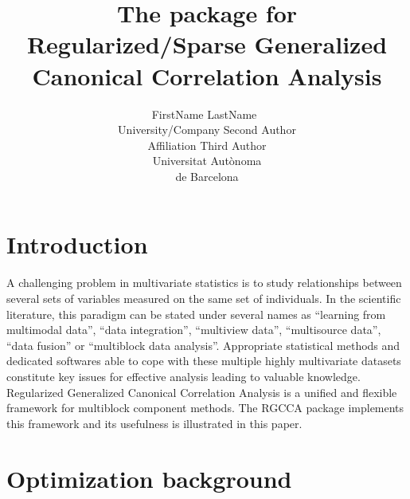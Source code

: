 \documentclass[
]{jss}
\author{
FirstName
LastName~\orcidlink{0000-0000-0000-0000}\\University/Company \And Second
Author\\Affiliation \AND Third Author\\Universitat Autònoma\\
de Barcelona
}
\title{The \pkg{RGCCA} package for Regularized/Sparse Generalized
Canonical Correlation Analysis}
\begin{document}
\newcommand{\ma}[1]{\ensuremath{\mathbf{#1}}}
\newcommand{\sign}{\ensuremath{\mathrm{sign}}}
\newcommand{\mat}[1]{\textbf{\text{#1}}}
\newcommand{\cov}{\ensuremath{\text{cov}}}
\newcommand{\var}{\ensuremath{\mathrm{var}}}
\newcommand{\tr}{\ensuremath{\mathrm{tr}}}
\newcommand{\argmin}{\ensuremath{\mathrm{argmin}}}
\newcommand{\argmax}{\ensuremath{\mathrm{argmax}}}
\newcommand{\X}{\mathbf{X}}
\newcommand{\A}{\mathbf{A}}
\newcommand{\Q}{\mathbf{Q}}
\newcommand{\M}{\mathbf{M}}
\newcommand{\C}{\mathbf{C}}
\newcommand{\mbc}{\mathbf{c}}
\newcommand{\I}{\mathbf{I}}
\newcommand{\mbP}{\mathbf{P}}
\newcommand{\mba}{\mathbf{a}}
\newcommand{\z}{\mathbf{z}}
\newcommand{\w}{\mathbf{w}}
\newcommand{\y}{\mathbf{y}}
\newcommand{\mbb}{\mathbf{b}}
\newcommand{\Xu}{\underline{\mathbf{X}}}
\newcommand{\Pu}{\underline{\mathbf{P}}}
\newcommand{\x}{\mathbf{x}}
\newcommand{\K}{\mathbf{K}}
\newcommand{\mcH}{\mathcal{H}}
\newcommand{\bsx}{\boldsymbol{x}}
\newcommand{\bsxi}{\boldsymbol{\xi}}
\newcommand{\bsa}{\boldsymbol{\alpha}}

\newtheorem{theorem}{theorem}[section]%
\newtheorem{lemma}[theorem]{Lemma}
\newtheorem{proposition}[theorem]{Proposition}
\newtheorem{corollary}[theorem]{Corollary}
\newtheorem{remark}[theorem]{Remark}

\hypertarget{introduction}{%
\section{Introduction}\label{introduction}}

A challenging problem in multivariate statistics is to study
relationships between several sets of variables measured on the same set
of individuals. In the scientific literature, this paradigm can be
stated under several names as ``learning from multimodal data'', ``data
integration'', ``multiview data'', ``multisource data'', ``data fusion''
or ``multiblock data analysis''. Appropriate statistical methods and
dedicated softwares able to cope with these multiple highly multivariate
datasets constitute key issues for effective analysis leading to
valuable knowledge. Regularized Generalized Canonical Correlation
Analysis is a unified and flexible framework for multiblock component
methods. The RGCCA package implements this framework and its usefulness
is illustrated in this paper.

\hypertarget{optimization-background}{%
\section{Optimization background}\label{optimization-background}}
\end{document}
